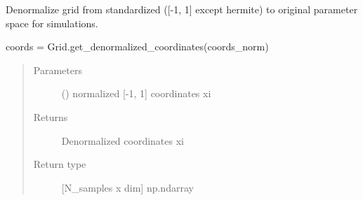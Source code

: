 \documentclass[letterpaper,10pt,english,openany,oneside]{sphinxmanual}
\begin{document}
\begin{fulllineitems}
\begin{fulllineitems}
\begin{quote}
\begin{description}
\end{description}\end{quote}

\end{fulllineitems}


\begin{fulllineitems}
\label{\detokenize{pygpc:pygpc.Grid.Grid.coords}}
\end{fulllineitems}


\begin{fulllineitems}
\label{\detokenize{pygpc:pygpc.Grid.Grid.coords_norm}}
\end{fulllineitems}


\begin{fulllineitems}
\label{\detokenize{pygpc:pygpc.Grid.Grid.get_denormalized_coordinates}}
Denormalize grid from standardized ({[}-1, 1{]} except hermite) to original parameter space for simulations.

coords = Grid.get\_denormalized\_coordinates(coords\_norm)
\begin{quote}\begin{description}
\item[{Parameters}] \leavevmode
{} (\sphinxstyleliteralemphasis{\sphinxupquote{{[}}}\sphinxstyleliteralemphasis{\sphinxupquote{{]} }}) \textendash{} normalized {[}-1, 1{]} coordinates xi

\item[{Returns}] \leavevmode
{} \textendash{} Denormalized coordinates xi

\item[{Return type}] \leavevmode
{[}N\_samples x dim{]} np.ndarray

\end{description}\end{quote}

\end{fulllineitems}


\end{fulllineitems}
\end{document}
